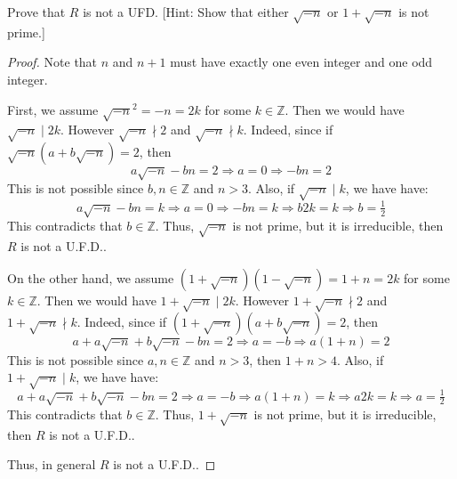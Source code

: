 \begin{question}
    Prove that $R$ is not a UFD. [Hint: Show that either $\sqrt{-n}$ or $1+\sqrt{-n}$ is not prime.]
\end{question}

\begin{answer}
    \begin{proof}
        Note that $n$ and $n+1$ must have exactly one even integer and one odd integer.
        
        First, we assume $\sqrt{-n}^2 = -n = 2k$ for some $k \in \mathbb{Z}$. Then we would have $\sqrt{-n} \mid 2k$. However $\sqrt{-n} \nmid 2$ and $\sqrt{-n} \nmid k$. Indeed, since if $\sqrt{-n}(a + b\sqrt{-n}) = 2$, then
        \begin{equation}
            a\sqrt{-n} - bn = 2 \Rightarrow a = 0 \Rightarrow -bn = 2
        \end{equation}
        This is not possible since $b,n \in \mathbb{Z}$ and $n > 3$. Also, if $\sqrt{-n} \mid k$, we have have:
        \begin{equation}
            a\sqrt{-n} - bn = k \Rightarrow a = 0 \Rightarrow -bn = k \Rightarrow b2k = k \Rightarrow b = \tfrac{1}{2}
        \end{equation}
        This contradicts that $b \in \mathbb{Z}$. Thus, $\sqrt{-n}$ is not prime, but it is irreducible, then $R$ is not a U.F.D..
        
        On the other hand, we assume $(1 + \sqrt{-n})(1 - \sqrt{-n}) = 1+n = 2k$ for some $k \in \mathbb{Z}$. Then we would have $1 + \sqrt{-n} \mid 2k$. However $1 + \sqrt{-n} \nmid 2$ and $1 + \sqrt{-n} \nmid k$. Indeed, since if $(1 + \sqrt{-n})(a + b\sqrt{-n}) = 2$, then
        \begin{equation}
            a + a\sqrt{-n} + b\sqrt{-n} - bn = 2 \Rightarrow a = -b \Rightarrow a(1+n) = 2
        \end{equation}
        This is not possible since $a,n \in \mathbb{Z}$ and $n > 3$, then $1+n > 4$. Also, if $1 + \sqrt{-n} \mid k$, we have have:
        \begin{equation}
            a + a\sqrt{-n} + b\sqrt{-n} - bn = 2 \Rightarrow a = -b \Rightarrow a(1+n) = k \Rightarrow a2k = k \Rightarrow a = \tfrac{1}{2}
        \end{equation}
        This contradicts that $b \in \mathbb{Z}$. Thus, $1 + \sqrt{-n}$ is not prime, but it is irreducible, then $R$ is not a U.F.D..
        
        Thus, in general $R$ is not a U.F.D..
    \end{proof}
\end{answer}

